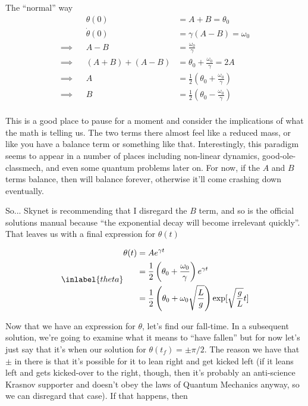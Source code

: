 \begin{answer}
\begin{answerpart}{The ``normal'' way}
    \begin{equation}
      \begin{alignedat}{2}
        && \theta(0) &= A + B = \theta_0\\
        && \dot{\theta}(0) &= \gamma (A - B) = \omega_0\\
        \implies&& A - B &= \frac{\omega_0}{\gamma}\\
        \implies&& (A + B) + (A - B)
        &= \theta_0 + \frac{\omega_0}{\gamma} = 2A\\
        \implies&& A &= \frac{1}{2}\left(\theta_0 + \frac{\omega_0}{\gamma}\right)\\
        \implies&& B &= \frac{1}{2}\left(\theta_0 - \frac{\omega_0}{\gamma}\right)\\
      \end{alignedat}
    \end{equation}

    This is a good place to pause for a moment and consider the
    implications of what the math is telling us.  The two terms there
    almost feel like a reduced mass, or like you have a balance term
    or something like that.  Interestingly, this paradigm seems to
    appear in a number of places including non-linear dynamics,
    good-ole-classmech, and even some quantum problems later on.  For
    now, if the $A$ and $B$ terms balance, then \icepick{} will
    balance forever, otherwise it'll come crashing down eventually.

    So... Skynet is recommending that I disregard the $B$ term, and so
    is the official solutions manual because ``the exponential decay
    will become irrelevant quickly''.  That leaves us
    with a final expression for $\theta(t)$

    \begin{equation}
      \inlabel{theta}
      \begin{split}
        \theta(t)
        &= Ae^{\gamma t}\\
        &= \frac{1}{2}\left(\theta_0 + \frac{\omega_0}{\gamma}\right)e^{\gamma t}\\
        &= \frac{1}{2}\left(\theta_0 + \omega_0\sqrt{\frac{L}{g}}\right)\exp[\sqrt{\frac{g}{L}} t]\\
      \end{split}
    \end{equation}

    Now that we have an expression for $\theta$, let's find our
    fall-time.  In a subsequent solution, we're going to examine what
    it means to ``have fallen'' but for now let's just say that it's
    when our solution for $\theta(t_f) = \pm \pi/2$.  The reason we
    have that $\pm$ in there is that it's possible for it to lean
    right and get kicked left (if it leans left and gets kicked-over
    to the right, though, then it's probably an anti-science Krasnov
    supporter and doesn't obey the laws of Quantum Mechanics anyway,
    so we can disregard that case).  If that happens, then


\end{answerpart}
\end{answer}
